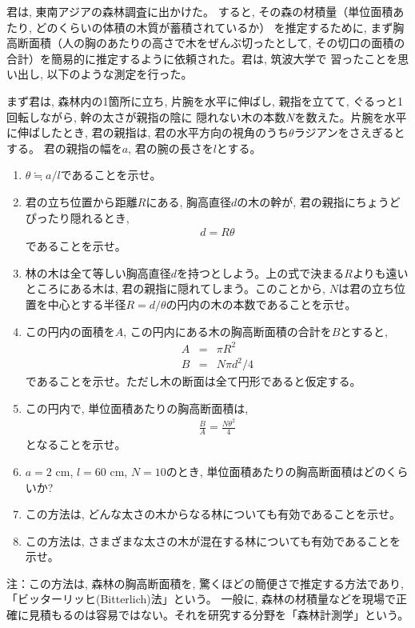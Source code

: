 \begin{q}\label{q:Bitterrich} 君は, 東南アジアの森林調査に出かけた。
すると, その森の材積量（単位面積あたり, どのくらいの体積の木質が蓄積されているか）
を推定するために, まず胸高断面積（人の胸のあたりの高さで木をぜんぶ切ったとして, 
その切口の面積の合計）を簡易的に推定するように依頼された。君は, 筑波大学で
習ったことを思い出し, 以下のような測定を行った。

まず君は, 森林内の1箇所に立ち, 片腕を水平に伸ばし, 親指を立てて, ぐるっと1回転しながら, 幹の太さが親指の陰に
隠れない木の本数$N$を数えた。片腕を水平に伸ばしたとき, 君の親指は, 君の水平方向の視角のうち$\theta$ラジアンをさえぎるとする。
君の親指の幅を$a$, 君の腕の長さを$l$とする。
\begin{enumerate}
\item $\theta \fallingdotseq a/l$であることを示せ。
\item 君の立ち位置から距離$R$にある, 胸高直径$d$の木の幹が, 君の親指にちょうどぴったり隠れるとき, 
\begin{eqnarray}d=R\theta\end{eqnarray}
であることを示せ。
\item 林の木は全て等しい胸高直径$d$を持つとしよう。上の式で決まる$R$よりも遠いところにある木は, 君の親指に隠れてしまう。このことから, 
$N$は君の立ち位置を中心とする半径$R=d/\theta$の円内の木の本数であることを示せ。
\item この円内の面積を$A$, この円内にある木の胸高断面積の合計を$B$とすると, 
\begin{eqnarray}
A&=&\pi R^2\\
B&=&N\pi d^2/4\end{eqnarray}
であることを示せ。ただし木の断面は全て円形であると仮定する。
\item この円内で, 単位面積あたりの胸高断面積は, 
\begin{eqnarray}\frac{B}{A}=\frac{N\theta^2}{4}\label{eq:Bitterrich_5}\end{eqnarray}
となることを示せ。
\item $a=2$ cm, $l=60$ cm, $N=10$のとき, 単位面積あたりの胸高断面積はどのくらいか? 
\item この方法は, どんな太さの木からなる林についても有効であることを示せ。
\item この方法は, さまざまな太さの木が混在する林についても有効であることを示せ。
\end{enumerate}
注：この方法は, 森林の胸高断面積を, 驚くほどの簡便さで推定する方法であり, 「ビッターリッヒ(Bitterlich)法」という。
一般に, 森林の材積量などを現場で正確に見積もるのは容易ではない。それを研究する分野を「森林計測学」という。
\end{q}
\hv

